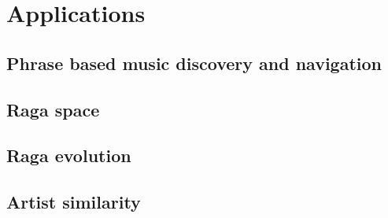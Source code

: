 
\chapter{Applications}

\section{Phrase based music discovery and navigation}
\section{Raga space}
\section {Raga evolution}
\section{Artist similarity}


